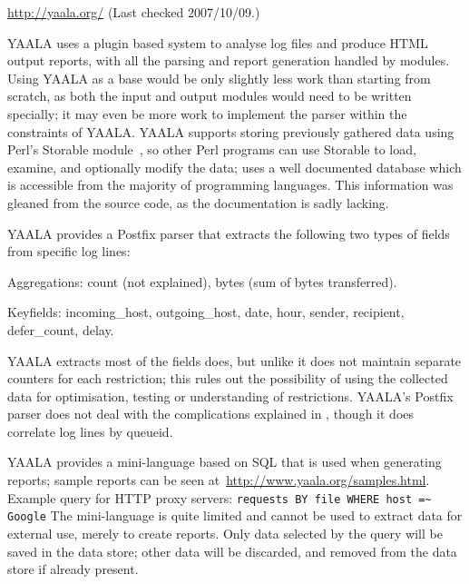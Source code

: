 \noindent{}\url{http://yaala.org/} \newline{}
(Last checked 2007/10/09.)

YAALA uses a plugin based system to analyse log files and produce HTML
output reports, with all the parsing and report generation handled by
modules.  Using YAALA as a base would be only slightly less work than
starting from scratch, as both the input and output modules would need to
be written specially; it may even be more work to implement the parser
within the constraints of YAALA\@.  YAALA supports storing previously
gathered data using Perl's Storable module~\cite{perl-storable}, so other
Perl programs can use Storable to load, examine, and optionally modify the
data; \parsername{} uses a well documented database which is accessible
from the majority of programming languages.  This information was gleaned
from the source code, as the documentation is sadly lacking.

YAALA provides a Postfix parser that extracts the following two types of
fields from specific log lines:

\begin{eqlist}

    \item [Aggregations:] count (not explained), bytes (sum of bytes
        transferred).

    \item [Keyfields:] incoming\_host, outgoing\_host, date, hour, sender,
        recipient, defer\_count, delay.

\end{eqlist}

YAALA extracts most of the fields \parsername{} does, but unlike
\parsername{} it does not maintain separate counters for each restriction;
this rules out the possibility of using the collected data for
optimisation, testing or understanding of restrictions.  YAALA's Postfix
parser does not deal with the complications explained in
, though it does correlate log lines by queueid.

YAALA provides a mini-language based on \gls{SQL} that is used when
generating reports; sample reports can be seen
at~\url{http://www.yaala.org/samples.html}.  Example query for HTTP proxy
servers: \newline{} \tab{} \texttt{requests BY file WHERE host =\~{}
Google} \newline{} The mini-language is quite limited and cannot be used to
extract data for external use, merely to create reports.  Only data
selected by the query will be saved in the data store; other data will be
discarded, and removed from the data store if already present.

